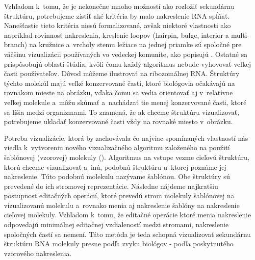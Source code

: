 Vzhľadom k~tomu, že je nekonečne mnoho možností ako rozložiť sekundárnu štruktúru,
potrebujeme zistiť aké kritéria by malo nakreslenie RNA spĺňať. Nanešťastie
tieto kritéria niesú formalizované, avšak niektoré vlastnosti ako napríklad
rovinnosť nakreslenia, kreslenie loopov (hairpin, bulge, interior a multi-branch)
na kružnice a~vrcholy stemu ležiace na jednej priamke sú spoločné pre väčšinu
vizualizácii používaných vo vedeckej komunite, ako popisujú \citet{RNA_DRAW}.
Ostatné sa prispôsobujú oblasti štúdia, kvôli čomu každý algoritmus nebude
vyhovovať veľkej časti používateľov.
Dôvod môžeme ilustrovať na ribozomálnej RNA. Štruktúry týchto molekúl
majú veľké konzervované časti, ktoré biológovia očakávajú na rovnakom mieste
na obrázku, vďaka čomu sa vedia orientovať aj v~relatívne veľkej molekule
a~môžu skúmať a~nachádzať tie menej konzervované časti, ktoré sa líšia medzi organizmami.
To znamená, že ak chceme štruktúru vizualizovať, potrebujeme ukladať
konzervované časti vždy na rovnaké miesto v~obrázku.

Potreba vizualizácie, ktorá by zachovávala čo najviac spomínaných vlastností
nás viedla k~vytvoreniu nového vizualizačného algoritmu založeného
na použití šablónovej (vzorovej) molekuly (\citet{ELIAS_HOKSZA}).
Algoritmus na vstupe vezme cieľovú
štruktúru, ktorú chceme vizualizovať a~inú, podobnú štruktúru u~ktorej poznáme jej
nakreslenie. Túto podobnú molekulu nazývame šablónou. Obe štruktúry sú
prevedené do ich stromovej reprezentácie. Následne nájdeme najkratšiu postupnosť
editačných operácií, ktoré prevedú strom molekuly šablónovej na vizualizovanú
molekulu a~rovnako menia aj nakreslenie šablóny na nakreslenie cieľovej molekuly.
Vzhľadom k~tomu, že editačné operácie ktoré menia nakreslenie odpovedajú
minimálnej editačnej vzdialeností medzi stromami, nakreslenie spoločných častí sa nemení.
Táto metóda je teda schopná vizualizovať sekundárnu štruktúru RNA
molekuly presne podľa zvyku biológov - podľa poskytnutého vzorového nakreslenia.


